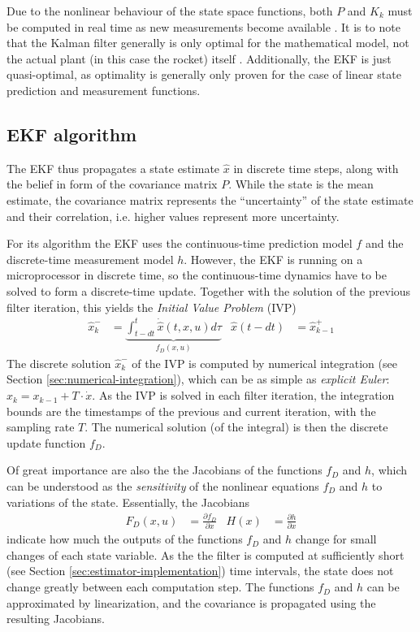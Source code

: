 Due to the nonlinear behaviour of the state space functions, both $P$ and $K_k$ must be computed in real time as new measurements become available \cite{lewis2008}.
It is to note that the Kalman filter generally is only optimal for the mathematical model, not the actual plant (in this case the rocket) itself \cite{lewis2008}.
Additionally, the EKF is just quasi-optimal, as optimality is generally only proven for the case of linear state prediction and measurement functions.

\subsection{EKF algorithm}
The EKF thus propagates a state estimate $\hat x$ in discrete time steps, along with the belief in form of the covariance matrix $P$.
While the state is the mean estimate, the covariance matrix represents the ``uncertainty'' of the state estimate and their correlation, i.e. higher values represent more uncertainty. 

For its algorithm the EKF uses the continuous-time prediction model $f$ and the discrete-time measurement model $h$.
However, the EKF is running on a microprocessor in discrete time, so the continuous-time dynamics have to be solved to form a discrete-time update. 
Together with the solution of the previous filter iteration, this yields the \textit{Initial Value Problem} (IVP) 
\begin{align}
     \hat x_k^- &= \underbrace{\int_{t-dt}^{t} \dot{\hat x}(t,x,u) d\tau}_{f_D(x,u)}
     &
     \hat x (t-dt) &= \hat x_{k-1}^+
     \label{eq:estimator-ivp}
\end{align}
The discrete solution $\hat x_k^-$ of the IVP is computed by numerical integration (see Section \ref{sec:numerical-integration}), which can be as simple as \textit{explicit Euler}: $x_k = x_{k-1} + T \cdot \dot x$.
As the IVP is solved in each filter iteration, the integration bounds are the timestamps of the previous and current iteration, with the sampling rate $T$.
The numerical solution (of the integral) is then the discrete update function $f_D$.

Of great importance are also the the Jacobians of the functions $f_D$ and $h$, which can be understood as the \textit{sensitivity} of the nonlinear equations $f_D$ and $h$ to variations of the state.
Essentially, the Jacobians 
\begin{align}
    F_D(x, u) &= \frac{\partial f_D}{\partial x}
    &
    H(x) &= \frac{\partial h}{\partial x}
\end{align}
indicate how much the outputs of the functions $f_D$ and $h$ change for small changes of each state variable. 
As the the filter is computed at sufficiently short (see Section \ref{sec:estimator-implementation}) time intervals, the state does not change greatly between each computation step.
The functions $f_D$ and $h$ can be approximated by linearization, and the covariance is propagated using the resulting Jacobians.

